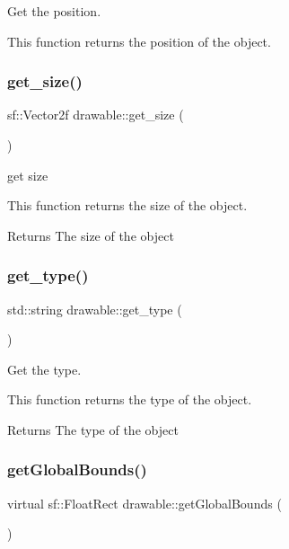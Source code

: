 Get the position. 

This function returns the position of the object. \mbox{\label{classdrawable_a58cb3ab0406d40e9cea3aefac1e4bf05}} 
\subsubsection{\texorpdfstring{get\+\_\+size()}{get\_size()}}
{\footnotesize\ttfamily sf\+::\+Vector2f drawable\+::get\+\_\+size (\begin{DoxyParamCaption}{ }\end{DoxyParamCaption})\hspace{0.3cm}{\ttfamily [virtual]}}



get size 

This function returns the size of the object.

\begin{DoxyReturn}{Returns}
The size of the object 
\end{DoxyReturn}
\mbox{\label{classdrawable_a329e564296d591dc8bd2f6dc5a205213}} 
\subsubsection{\texorpdfstring{get\+\_\+type()}{get\_type()}}
{\footnotesize\ttfamily std\+::string drawable\+::get\+\_\+type (\begin{DoxyParamCaption}{ }\end{DoxyParamCaption})}



Get the type. 

This function returns the type of the object.

\begin{DoxyReturn}{Returns}
The type of the object 
\end{DoxyReturn}
\mbox{\label{classdrawable_ae013ac0be47538be9ce885d6642daf73}} 
\subsubsection{\texorpdfstring{get\+Global\+Bounds()}{getGlobalBounds()}}
{\footnotesize\ttfamily virtual sf\+::\+Float\+Rect drawable\+::get\+Global\+Bounds (\begin{DoxyParamCaption}{ }\end{DoxyParamCaption})\hspace{0.3cm}{\ttfamily [pure virtual]}}



